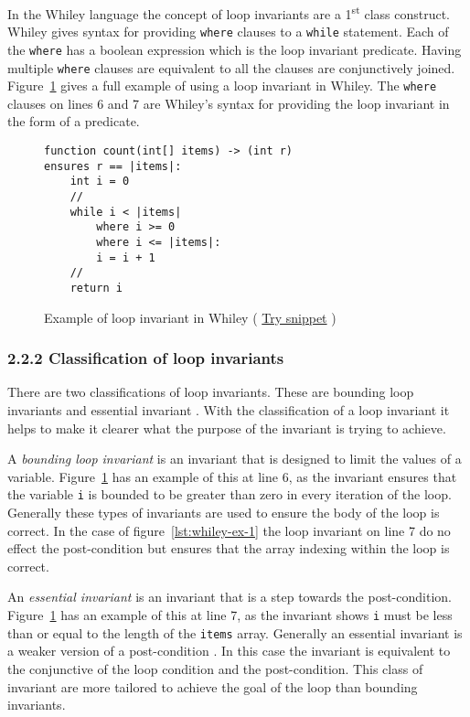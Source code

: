 \documentclass[11pt, a4paper, twoside, openright]{report}
\newcommand{\code}[1]{\texttt{#1}}
\begin{document}
In the Whiley language the concept of loop invariants are a 1\textsuperscript{st} class
construct.
Whiley gives syntax for providing \code{where} clauses to a \code{while}
statement.
Each of the \code{where} has a boolean expression which is the loop
invariant predicate.
Having multiple \code{where} clauses are equivalent to all the clauses are
conjunctively joined.
Figure~\ref{lst:whiley-inv} gives a full example of using a loop invariant
in Whiley. The \code{where} clauses on lines 6 and 7 are Whiley's syntax for
providing the loop invariant in the form of a predicate. 

\begin{figure}[ht]
\begin{lstlisting}
function count(int[] items) -> (int r)
ensures r == |items|:
    int i = 0
    //
    while i < |items|
        where i >= 0
        where i <= |items|:
        i = i + 1
    //
    return i
\end{lstlisting}
    \caption{Example of loop invariant in Whiley (
    \href{http://whiley.org/play/?id=DzLm1T}{Try snippet} ) }
    \label{lst:whiley-inv}
\end{figure}

\subsubsection*{2.2.2 Classification of loop invariants}

There are two classifications of loop invariants.
These are bounding loop invariants and essential invariant
\cite{invarints-classifiction}.
With the classification of a loop invariant it helps to make
it clearer what the purpose of the invariant is trying to achieve.

A \textit{bounding loop invariant} is an invariant that is designed
to limit the values of a variable.
Figure~\ref{lst:whiley-inv} has an example of this at line 6, as the invariant
ensures that the variable \code{i} is bounded to be greater than zero
in every iteration of the loop.
Generally these types of invariants are used to ensure the body of the loop
is correct. In the case of figure~\ref{lst:whiley-ex-1} the loop invariant on line
7 do no effect the post-condition but ensures that the array indexing within
the loop is correct.

An \textit{essential invariant} is an invariant that is a step towards the
post-condition.
Figure~\ref{lst:whiley-inv} has an example of this at line 7, 
as the invariant shows \code{i} must be less than or
equal to the length of the \code{items} array.
Generally an essential invariant is a weaker version of a post-condition
\cite{invarints-classifiction}.
In this case the invariant is equivalent to the conjunctive 
of the loop condition and the post-condition.
This class of invariant are more tailored to achieve 
the goal of the loop than bounding invariants.
\end{document}
